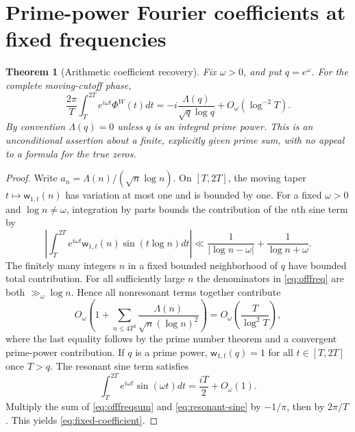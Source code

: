 \documentclass[11pt,leqno]{amsart}
\numberwithin{equation}{section}
\newtheorem{theorem}{Theorem}[section]
\theoremstyle{definition}
\theoremstyle{remark}
\newcommand{\1}{\mathbf 1}
\newcommand{\wt}{\mathsf w}
\begin{document}
\section{Prime-power Fourier coefficients at fixed frequencies}\label{sec:fixed-fourier}
\begin{theorem}[Arithmetic coefficient recovery]\label{thm:prime-coeff}
Fix $\omega>0$, and put $q=e^\omega$. For the \emph{complete moving-cutoff} phase,
\begin{equation}\label{eq:fixed-coefficient}
 \boxed{\frac{2\pi}{T}\int_T^{2T}e^{i\omega t}\Phi^W(t)dt
 =-i\frac{\Lambda(q)}{\sqrt q\log q}+O_\omega(\log^{-2}T).}
\end{equation}
By convention $\Lambda(q)=0$ unless $q$ is an integral prime power. This is an unconditional assertion about a finite, explicitly given prime sum, with no appeal to a formula for the true zeros.
\end{theorem}
\begin{proof}
Write $a_n=\Lambda(n)/(\sqrt n\log n)$. On $[T,2T]$, the moving taper $t\mapsto\wt_{1,t}(n)$ has variation at most one and is bounded by one. For a fixed $\omega>0$ and $\log n\ne\omega$, integration by parts bounds the contribution of the $n$th sine term by
\begin{equation}\label{eq:offfreq}
 \left|\int_T^{2T}e^{i\omega t}\wt_{1,t}(n)\sin(t\log n)dt\right|
 \ll\frac1{|\log n-\omega|}+\frac1{\log n+\omega}.
\end{equation}
The finitely many integers $n$ in a fixed bounded neighborhood of $q$ have bounded total contribution. For all sufficiently large $n$ the denominators in \eqref{eq:offfreq} are both $\gg_\omega\log n$. Hence all nonresonant terms together contribute
\begin{equation}\label{eq:offfreqsum}
 O_\omega\left(1+\sum_{n\le4T^2}\frac{\Lambda(n)}{\sqrt n(\log n)^2}\right)
 =O_\omega\left(\frac T{\log^2T}\right),
\end{equation}
where the last equality follows by the prime number theorem and a convergent prime-power contribution. If $q$ is a prime power, $\wt_{1,t}(q)=1$ for all $t\in[T,2T]$ once $T>q$. The resonant sine term satisfies
\begin{equation}\label{eq:resonant-sine}
 \int_T^{2T}e^{i\omega t}\sin(\omega t)dt=\frac{iT}{2}+O_\omega(1).
\end{equation}
Multiply the sum of \eqref{eq:offfreqsum} and \eqref{eq:resonant-sine} by $-1/\pi$, then by $2\pi/T$. This yields \eqref{eq:fixed-coefficient}.
\end{proof}
\end{document}
